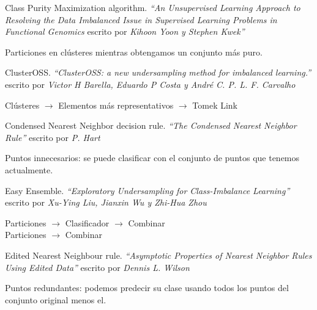 \documentclass[10pt]{beamer}
\begin{document}
\begin{frame}[fragile]{Class Purity Maximization algorithm.}
\textit{``An Unsupervised Learning Approach to Resolving the Data Imbalanced Issue in Supervised Learning Problems in Functional Genomics} escrito por \textit{Kihoon Yoon y Stephen Kwek''} \cite{cpm} \\
\bigskip
\bigskip

Particiones en clústeres mientras obtengamos un conjunto más puro.
\end{frame}

\begin{frame}[fragile]{ClusterOSS.}
\textit{``ClusterOSS: a new undersampling method for imbalanced learning.''} escrito por \textit{Victor H Barella, Eduardo P Costa y André C. P. L. F. Carvalho} \cite{clusteross} \\
\bigskip
\bigskip

Clústeres $\rightarrow$ Elementos más representativos $\rightarrow$ Tomek Link
\end{frame}

\begin{frame}[fragile]{Condensed Nearest Neighbor decision rule.}
\textit{``The Condensed Nearest Neighbor Rule''} escrito por \textit{P. Hart} \cite{cnn} \\
\bigskip
\bigskip

Puntos innecesarios: se puede clasificar con el conjunto de puntos que tenemos actualmente.
\end{frame}

\begin{frame}[fragile]{Easy Ensemble.}
\textit{``Exploratory Undersampling for Class-Imbalance Learning''} escrito por \textit{Xu-Ying Liu, Jianxin Wu y Zhi-Hua Zhou} \cite{bc-ee} \\
\bigskip
\bigskip

Particiones $\rightarrow$ Clasificador $\rightarrow$ Combinar \\
Particiones $\rightarrow$ Combinar
\end{frame}

\begin{frame}[fragile]{Edited Nearest Neighbour rule.}
\textit{``Asymptotic Properties of Nearest Neighbor Rules Using Edited Data''} escrito por \textit{Dennis L. Wilson} \cite{enn} \\
\bigskip
\bigskip

Puntos redundantes: podemos predecir su clase usando todos los puntos del conjunto original menos el.
\end{frame}
\end{document}
